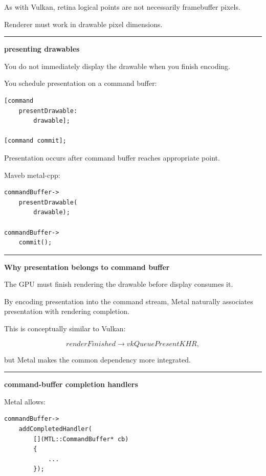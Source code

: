 As with Vulkan, retina logical points are not necessarily framebuffer pixels.

Renderer must work in drawable pixel dimensions.

\begin{center}\rule{0.5\linewidth}{0.5pt}\end{center}

\textbf{presenting drawables}

You do not immediately display the drawable when you finish encoding.

You schedule presentation on a command buffer:

\begin{verbatim}
[command
    presentDrawable:
        drawable];

[command commit];
\end{verbatim}

Presentation occurs after command buffer reaches appropriate point.

Maveb metal-cpp:

\begin{verbatim}
commandBuffer->
    presentDrawable(
        drawable);

commandBuffer->
    commit();
\end{verbatim}

\begin{center}\rule{0.5\linewidth}{0.5pt}\end{center}

\textbf{Why presentation belongs to command buffer}

The GPU must finish rendering the drawable before display consumes it.

By encoding presentation into the command stream, Metal naturally associates presentation with rendering completion.

This is conceptually similar to Vulkan:

\[
renderFinished
\rightarrow
vkQueuePresentKHR,
\]

but Metal makes the common dependency more integrated.

\begin{center}\rule{0.5\linewidth}{0.5pt}\end{center}

\textbf{command-buffer completion handlers}

Metal allows:

\begin{verbatim}
commandBuffer->
    addCompletedHandler(
        [](MTL::CommandBuffer* cb)
        {
            ...
        });
\end{verbatim}

